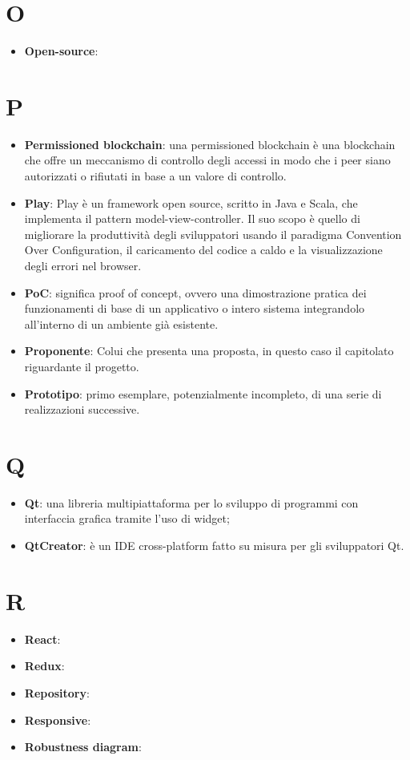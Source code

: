 \documentclass[a4paper, oneside, openany]{article}
\begin{document}
\section{O}
\begin{itemize}
\item \textbf{Open-source}:
\end{itemize}

\section{P}
\begin{itemize}
\item \textbf{Permissioned blockchain}: una permissioned blockchain è una blockchain che offre un meccanismo di controllo degli accessi in modo che i peer siano autorizzati o rifiutati in base a un valore di controllo.
\item \textbf{Play}: Play è un framework open source, scritto in Java e Scala, che implementa il pattern model-view-controller. Il suo scopo è quello di migliorare la produttività degli sviluppatori usando il paradigma Convention Over Configuration, il caricamento del codice a caldo e la visualizzazione degli errori nel browser.
\item \textbf{PoC}: significa proof of concept, ovvero una dimostrazione pratica dei funzionamenti di base di un applicativo o intero sistema integrandolo all'interno di un ambiente già esistente.
\item \textbf{Proponente}: Colui che presenta una proposta, in questo caso il capitolato riguardante il progetto. 
\item \textbf{Prototipo}: primo esemplare, potenzialmente incompleto, di una serie di realizzazioni successive.
\end{itemize}

\section{Q}
\begin{itemize}
\item \textbf{Qt}: una libreria multipiattaforma per lo sviluppo di programmi con interfaccia grafica tramite l'uso di widget;
\item \textbf{QtCreator}: è un IDE cross-platform fatto su misura per gli sviluppatori Qt.
\end{itemize}

\section{R}
\begin{itemize}
\item \textbf{React}:
\item \textbf{Redux}:
\item \textbf{Repository}:
\item \textbf{Responsive}:
\item \textbf{Robustness diagram}:
\end{itemize}
\end{document}
